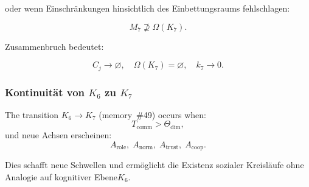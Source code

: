 oder wenn Einschränkungen hinsichtlich des Einbettungsraums fehlschlagen:

\[
 M_7 \not\supseteq \Omega(K_7).
\]

Zusammenbruch bedeutet:

\[
 C_j \to \varnothing,\quad
 \Omega(K_7)=\varnothing,\quad
 k_7\to 0.
\]

\subsubsection{Kontinuität von \texorpdfstring{$K_6$}{K_6} zu \texorpdfstring{$K_7$}{K_7}}

The transition $K_6\to K_7$ (memory~\#49) occurs when:
\[
  T_{\mathrm{comm}} > \Theta_{\mathrm{dim}},
\]
und neue Achsen erscheinen:
\[
  A_{\mathrm{role}},\;
  A_{\mathrm{norm}},\;
  A_{\mathrm{trust}},\;
  A_{\mathrm{coop}}.
\]

Dies schafft neue Schwellen und ermöglicht die Existenz sozialer Kreisläufe
ohne Analogie auf kognitiver Ebene$K_6$.

